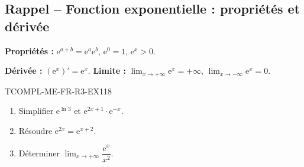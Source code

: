 

\subsection*{Rappel -- Fonction exponentielle : propriétés et dérivée}

\textbf{Propriétés :} $\mathrm{e}^{a+b} = \mathrm{e}^a \mathrm{e}^b$, $\mathrm{e}^0 = 1$, $\mathrm{e}^x > 0$.

\textbf{Dérivée :} $(\mathrm{e}^x)' = \mathrm{e}^x$. \textbf{Limite :} $\lim_{x \to +\infty} \mathrm{e}^x = +\infty$, $\lim_{x \to -\infty} \mathrm{e}^x = 0$.

\begin{exercice}{TCOMPL-ME-FR-R3-EX1}{1}{8}
\begin{enumerate}
  \item Simplifier $\mathrm{e}^{\ln 3}$ et $\mathrm{e}^{2x + 1} \cdot \mathrm{e}^{-x}$.
  \item Résoudre $\mathrm{e}^{2x} = \mathrm{e}^{x+2}$.
  \item Déterminer $\lim_{x \to +\infty} \dfrac{\mathrm{e}^x}{x^2}$.
\end{enumerate}
\end{exercice}

